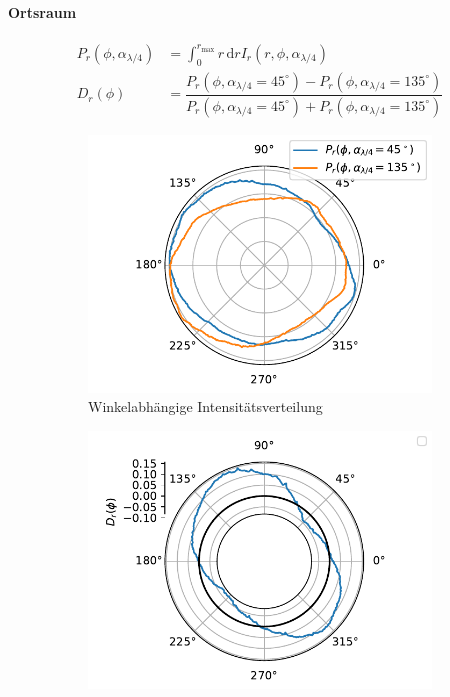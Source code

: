 \documentclass[titlepage,  ngerman]{article}
\begin{document}
		\paragraph{Ortsraum}
		\begin{align}
			\label{eq:integration_angular_int}
			P_r(\phi, \alpha_{\lambda/4}) &= \int_{0}^{r_\mathrm{max}}r\,\mathrm{d}r I_r(r, \phi, \alpha_{\lambda /4}) \\
			D_r(\phi) &= \dfrac{P_r(\phi, \alpha_{\lambda/4} = 45^\circ) - P_r(\phi, \alpha_{\lambda/4} = 135^\circ)}{P_r(\phi, \alpha_{\lambda/4} = 45^\circ) + P_r(\phi, \alpha_{\lambda/4} = 135^\circ)}
		\end{align}
		\begin{figure}[h]		
			\begin{subfigure}{0.5\textwidth}
				\centering
				\includegraphics[width=\textwidth]{figures/new/4_7_fp_angular_distribution_45_135.pdf}
				\caption{Winkelabhängige Intensitätsverteilung}
				\label{fig:angular_int_fp}
			\end{subfigure}
			\hfill
			\begin{subfigure}{0.49\textwidth}
				\centering
				\includegraphics[width=\textwidth]{figures/new/4_7_fp_angular_distribution_diff_45_135.pdf}

\end{subfigure}
\end{figure}
\end{document}
